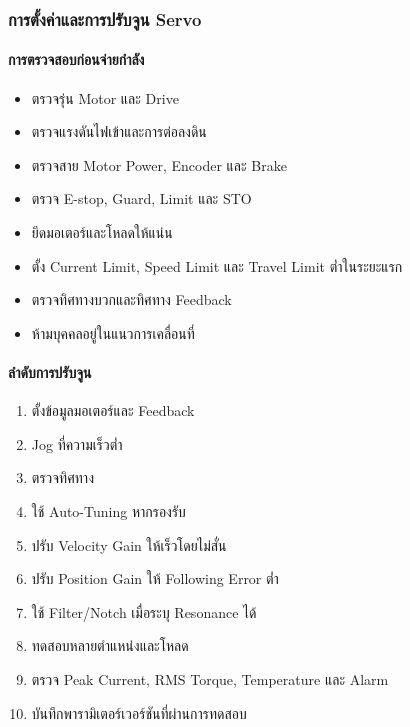 \subsubsection{การตั้งค่าและการปรับจูน Servo}

\paragraph{การตรวจสอบก่อนจ่ายกำลัง}

\begin{itemize}
    \item ตรวจรุ่น Motor และ Drive
    \item ตรวจแรงดันไฟเข้าและการต่อลงดิน
    \item ตรวจสาย Motor Power, Encoder และ Brake
    \item ตรวจ E-stop, Guard, Limit และ STO
    \item ยึดมอเตอร์และโหลดให้แน่น
    \item ตั้ง Current Limit, Speed Limit และ Travel Limit ต่ำในระยะแรก
    \item ตรวจทิศทางบวกและทิศทาง Feedback
    \item ห้ามบุคคลอยู่ในแนวการเคลื่อนที่
\end{itemize}

\paragraph{ลำดับการปรับจูน}

\begin{enumerate}
    \item ตั้งข้อมูลมอเตอร์และ Feedback
    \item Jog ที่ความเร็วต่ำ
    \item ตรวจทิศทาง
    \item ใช้ Auto-Tuning หากรองรับ
    \item ปรับ Velocity Gain ให้เร็วโดยไม่สั่น
    \item ปรับ Position Gain ให้ Following Error ต่ำ
    \item ใช้ Filter/Notch เมื่อระบุ Resonance ได้
    \item ทดสอบหลายตำแหน่งและโหลด
    \item ตรวจ Peak Current, RMS Torque, Temperature และ Alarm
    \item บันทึกพารามิเตอร์เวอร์ชันที่ผ่านการทดสอบ
\end{enumerate}

